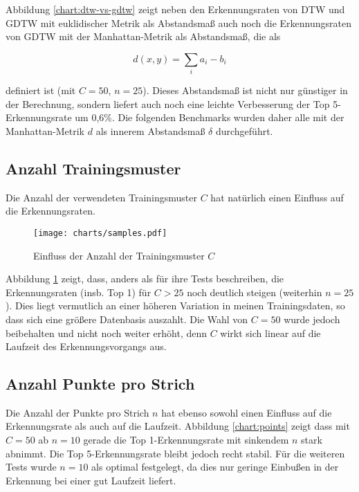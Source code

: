 Abbildung \ref{chart:dtw-vs-gdtw} zeigt neben den Erkennungsraten von DTW und GDTW mit euklidischer Metrik als Abstandsmaß auch noch die Erkennungsraten von GDTW mit der Manhattan-Metrik als Abstandsmaß, die als

\[ d(x,y) = \sum_i a_i - b_i \]

definiert ist (mit $C=50$, $n=25$). Dieses Abstandsmaß ist nicht nur günstiger in der Berechnung, sondern liefert auch noch eine leichte Verbesserung der Top 5-Erkennungsrate um 0,6\%. Die folgenden Benchmarks wurden daher alle mit der Manhattan-Metrik $d$ als innerem Abstandsmaß $\delta$ durchgeführt.

\subsection{Anzahl Trainingsmuster} %
\label{sub:anzahl_trainingsmuster}

Die Anzahl der verwendeten Trainingsmuster $C$ hat natürlich einen Einfluss auf die Erkennungsraten.

\begin{figure}[htbp]
  \begin{center}
    \texttt{[image: charts/samples.pdf]}
  \end{center}
  \caption{Einfluss der Anzahl der Trainingsmuster $C$}
  \label{chart:samples}
\end{figure}

Abbildung \ref{chart:samples} zeigt, dass, anders als \citet{Golubitsky:2009p1842} für ihre Tests beschreiben, die Erkennungsraten (insb. Top 1) für $C > 25$ noch deutlich steigen (weiterhin $n=25$). Dies liegt vermutlich an einer höheren Variation in meinen Trainingsdaten, so dass sich eine größere Datenbasis auszahlt. Die Wahl von $C=50$ wurde jedoch beibehalten und nicht noch weiter erhöht, denn $C$ wirkt sich linear auf die Laufzeit des Erkennungsvorgangs aus.

\subsection{Anzahl Punkte pro Strich} %
\label{sub:anzahl_punkte_pro_strich}

Die Anzahl der Punkte pro Strich $n$ hat ebenso sowohl einen Einfluss auf die Erkennungsrate als auch auf die Laufzeit. Abbildung \ref{chart:points} zeigt dass mit $C=50$ ab $n=10$ gerade die Top 1-Erkennungsrate mit sinkendem $n$ stark abnimmt. Die Top 5-Erkennungsrate bleibt jedoch recht stabil. Für die weiteren Tests wurde $n=10$ als optimal festgelegt, da dies nur geringe Einbußen in der Erkennung bei einer gut Laufzeit liefert.

